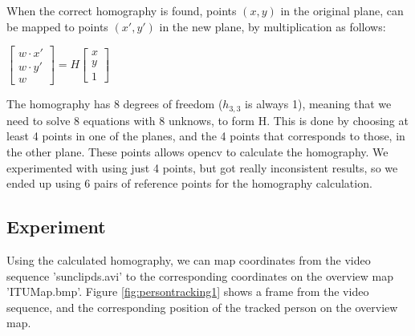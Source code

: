 \documentclass[a4paper,11pt]{article}
\begin{document}
When the correct homography is found, points $(x,y)$ in the original plane, can be mapped to points $(x',y')$ in the new plane, by multiplication as follows:

\begin{center}
$
\begin{bmatrix}
w\cdot x' \\
w\cdot y' \\
w
\end{bmatrix}
= H
\begin{bmatrix}
x \\
y \\
1
\end{bmatrix}
$
\end{center}

The homography has 8 degrees of freedom ($h_{3,3}$ is always 1), meaning that we need to solve 8 equations with 8 unknows, to form H. This is done by choosing at least 4 points in one of the planes, and the 4 points that corresponds to those, in the other plane. These points allows opencv to calculate the homography. We experimented with using just 4 points, but got really inconsistent results, so we ended up using 6 pairs of reference points for the homography calculation.

\subsection{Experiment}
Using the calculated homography, we can map coordinates from the video sequence 'sunclipds.avi' to the corresponding coordinates on the overview map 'ITUMap.bmp'. Figure \ref{fig:persontracking1} shows a frame from the video sequence, and the corresponding position of the tracked person on the overview map.
\end{document}
